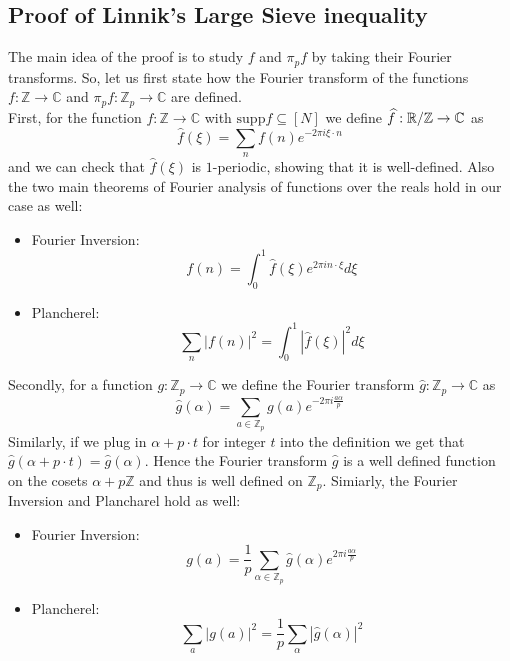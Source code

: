 \documentclass[12pt]{amsart}
\newcommand{\CC}{\mathbb{C}}
\newcommand{\ZZ}{\mathbb{Z}}
\begin{document}
\subsection{Proof of Linnik's Large Sieve inequality}
The main idea of the proof is to study $f$ and $\pi_p f$ by taking their Fourier transforms. So, let us first state how the Fourier transform of the functions $f: \ZZ \to \CC$ and $\pi_p f : \ZZ_p \to \CC$ are defined. \\

First, for the function $f : \ZZ \to \CC$ with $\mathrm{supp} f \subseteq [N]$ we define $\widehat{f} : \R/\ZZ \to \CC$ as
\begin{equation*}
    \widehat{f}(\xi) = \sum_n f(n) e^{-2 \pi i \xi \cdot n}
\end{equation*}
and we can check that $\widehat{f}(\xi)$ is $1$-periodic, showing that it is well-defined. Also the two main theorems of Fourier analysis of functions over the reals hold in our case as well:
\begin{itemize}
    \item[(i)] Fourier Inversion: 
    \begin{equation*}
        f(n) = \int_{0}^1 \widehat{f}(\xi) e^{2 \pi i n \cdot \xi} d \xi
    \end{equation*}
    \item[(ii)] Plancherel: 
    \begin{equation*}
        \sum_{n} |f(n)|^2 = \int_0^1 |\widehat{f}(\xi)|^2 d \xi
    \end{equation*}
\end{itemize} 

Secondly, for a function $g: \ZZ_p \to \CC$ we define the Fourier transform $\widehat{g}: \ZZ_p \to \CC$ as 
\begin{equation*}
    \widehat{g}(\alpha) = \sum_{a \in \ZZ_p} g(a) e^{- 2 \pi i \frac{a \alpha}{p}}
\end{equation*}
Similarly, if we plug in $\alpha + p \cdot t$ for integer $t$ into the definition we get that $\widehat{g}(\alpha + p \cdot t) = \widehat{g} (\alpha)$. Hence the Fourier transform $\widehat{g}$ is a well defined function on the cosets $\alpha + p \ZZ$ and thus is well defined on $\ZZ_p$. Simiarly, the Fourier Inversion and Plancharel hold as well: 
\begin{itemize}
    \item[(i)] Fourier Inversion: 
    \begin{equation*}
        g(a) = \frac{1}{p} \sum_{\alpha \in \ZZ_p} \widehat{g} (\alpha) e^{2 \pi i \frac{a \alpha}{p}}
    \end{equation*}
    \item[(ii)] Plancherel: 
    \begin{equation*}
        \sum_{a} |g(a)|^2 = \frac{1}{p} \sum_{\alpha} |\widehat{g}(\alpha)|^2
    \end{equation*}
\end{itemize} 
\end{document}
